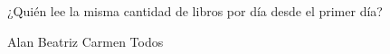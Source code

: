  ¿Quién lee la misma cantidad de libros por d\'ia desde el primer d\'ia?

\begin{oneparchoices}
    \choice Alan
    \choice Beatriz
    \choice Carmen
    \CorrectChoice Todos
\end{oneparchoices}